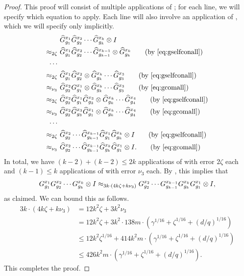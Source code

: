 \begin{proof}
This proof will consist of multiple applications of ;
for each line, we will specify which equation to apply.
Each line will also involve an application of ,
which we will specify only implicitly.
\begin{align*}
&  \widehat{G}^{x_1}_{g_1} \widehat{G}^{x_2}_{g_2} \cdots \widehat{G}^{x_k}_{g_k} \ot I\\
\approx_{2\zeta}~& \widehat{G}^{x_1}_{g_1} \widehat{G}^{x_2}_{g_2} \cdots \widehat{G}^{x_{k-1}}_{g_{k-1}} \ot \widehat{G}^{x_k}_{g_k} \tag{by \Cref{eq:gselfconall}}\\
\cdots~&\\
\approx_{2\zeta}~& \widehat{G}^{x_1}_{g_1} \widehat{G}^{x_2}_{g_2} \ot \widehat{G}^{x_k}_{g_k} \cdots \widehat{G}^{x_{3}}_{g_{3}}\tag{by \Cref{eq:gselfconall}}\\
\approx_{\nu_{3}}~&  \widehat{G}^{x_2}_{g_2}G^{x_1}_{g_1} \ot \widehat{G}^{x_k}_{g_k} \cdots \widehat{G}^{x_{3}}_{g_{3}}\tag{by \Cref{eq:gcomall}}\\
\approx_{2\zeta}~&  \widehat{G}^{x_2}_{g_2}\widehat{G}^{x_1}_{g_1} \widehat{G}^{x_3}_{g_3} \ot \widehat{G}^{x_k}_{g_k} \cdots \widehat{G}^{x_{4}}_{g_{4}}\tag{by \Cref{eq:gselfconall}}\\
\approx_{\nu_{3}}~&  \widehat{G}^{x_2}_{g_2}\widehat{G}^{x_3}_{g_3} \widehat{G}^{x_1}_{g_1} \ot \widehat{G}^{x_k}_{g_k} \cdots \widehat{G}^{x_{4}}_{g_{4}}\tag{by \Cref{eq:gcomall}}\\
\cdots~&\\
\approx_{2\zeta}~&  \widehat{G}^{x_2}_{g_2}\cdots \widehat{G}^{x_{k-1}}_{g_{k-1}} \widehat{G}^{x_1}_{g_1} \widehat{G}^{x_k}_{g_k} \ot I\tag{by \Cref{eq:gselfconall}}\\
\approx_{\nu_{3}}~&  \widehat{G}^{x_2}_{g_2}\cdots \widehat{G}^{x_{k-1}}_{g_{k-1}} \widehat{G}^{x_k}_{g_k} \widehat{G}^{x_1}_{g_1} \ot I.\tag{by \Cref{eq:gcomall}}
\end{align*}
In total, we have $(k-2) + (k-2) \leq 2k$ applications of  with error $2\zeta$ each
and $(k-1) \leq k$ applications of  with error $\nu_3$ each.
By , this implies that 
\begin{equation*}
G^{x_1}_{g_1} G^{x_2}_{g_2} \cdots G^{x_k}_{g_k} \otimes I
\approx_{3k \cdot (4k \zeta + k\nu_3)} G^{x_2}_{g_2}\cdots G^{x_{k-1}}_{g_{k-1}} G^{x_k}_{g_k} G^{x_1}_{g_1} \otimes I,
\end{equation*}
as claimed.
We can bound this as follows.
\begin{align*}
3k \cdot (4k \zeta + k\nu_3)
& = 12k^2 \zeta + 3k^2 \nu_3\\
&= 12k^2 \zeta + 3 k^2 \cdot 138 m \cdot \left(\gamma^{1/16} + \zeta^{1/16} + (d/q)^{1/16}\right)\\
&\leq 12k^2 \zeta^{1/16} + 414 k^2 m \cdot \left(\gamma^{1/16} + \zeta^{1/16} + (d/q)^{1/16}\right)\\
&\leq 426 k^2 m \cdot \left(\gamma^{1/16} + \zeta^{1/16} + (d/q)^{1/16}\right).
\end{align*}
This completes the proof.
\end{proof}

